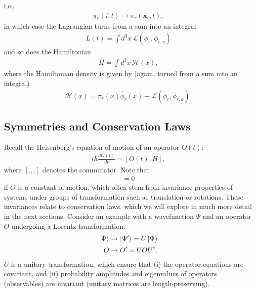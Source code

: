 \documentclass[a4paper,11pt]{article}
\numberwithin{equation}{section}
\theoremstyle{definition}
\newcommand{\lag}{\mathcal{L}}
\begin{document}
i.e., 
\begin{align}
\pi_r(i,t) \to \pi_r(\mathbf{x}_i,t),
\end{align}
in which case the Lagrangian turns from a sum into an integral
\begin{align}
L(t) = \int d^3x\, \lag(\phi_r, \phi_{r,a})
\end{align}
and so does the Hamiltonian
\begin{align}
H = \int d^3x\, \mathcal{H}(x),
\end{align}
where the Hamiltonian density is given by (again, turned from a sum into an integral)
\begin{align}
\mathcal{H}(x) = \pi_r(x)\dot{\phi_r}(x) - \lag(\phi_r, \phi_{r,a}).
\end{align}
\subsection{Symmetries and Conservation Laws}
Recall the Heisenberg's equation of motion of an operator $O(t)$:
\begin{align}
i\hbar \frac{dO(t)}{dt} = [O(t), H],
\end{align}
where $[.,.]$ denotes the commutator. Note that
\begin{align}
[O, H] = 0
\end{align}
if $O$ is a constant of motion, which often stem from invariance properties of systems under groups of transformation such as translation or rotations. These invariances relate to conservation laws, which we will explore in much more detail in the next sections. Consider an example with a wavefunction $\Psi$ and an operator $O$ undergoing a Lorentz transformation:
\begin{align}
\ket{\Psi} &\to \ket{\Psi'} = U\ket{\Psi}\\
O &\to O' = UOU^\dagger.
\end{align}
$U$ is a unitary transformation, which ensure that (i) the operator equations are covariant, and (ii) probability amplitudes and eigenvalues of operators (observables) are invariant (unitary matrices are length-preserving).\\
\end{document}
